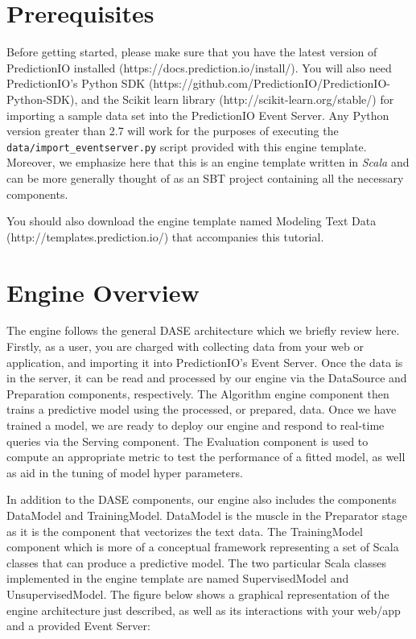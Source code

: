 \documentclass[a4paper,12pt]{article}
\renewcommand{\it}[1]{\textit{#1}}
\renewcommand{\tt}[1]{\texttt{#1}}
\newcommand{\3}{\left}
\newcommand{\4}{\right}
\renewcommand{\-}[1]{{}^{-#1}}
\begin{document}
\section*{Prerequisites}

Before getting started, please make sure that you have the latest version of PredictionIO installed (https://docs.prediction.io/install/). You will also need PredictionIO's Python SDK (https://github.com/PredictionIO/PredictionIO-Python-SDK), and the Scikit learn library (http://scikit-learn.org/stable/) for importing a sample data set into the PredictionIO Event Server. Any Python version greater than 2.7 will work for the purposes of executing the \tt{data/import\_eventserver.py} script provided with this engine template. Moreover, we emphasize here that this is an engine template written in \it{Scala} and can be more generally thought of as an SBT project containing all the necessary components.

You should also download the engine template named Modeling Text Data (http://templates.prediction.io/) that accompanies this tutorial.

\section*{Engine Overview}

The engine follows the general DASE architecture which we briefly review here. Firstly, as a user, you are charged with collecting data from your web or application, and importing it into PredictionIO's Event Server. Once the data is in the server, it  can be read and processed by our engine via the DataSource and Preparation components, respectively. The Algorithm engine component then trains a predictive model using the processed, or prepared, data. Once we have trained a model, we are ready to deploy our engine and respond to real-time queries via the Serving component. The Evaluation component is used to compute an appropriate metric to test the performance of a fitted model, as well as aid in the tuning of model hyper parameters. 

In addition to the DASE components, our engine also includes the components DataModel and TrainingModel. DataModel is the muscle in the Preparator stage as it is the component that vectorizes the text data. The TrainingModel component which is more of a conceptual framework representing a set of Scala classes that can produce a predictive model. The two particular Scala classes implemented in the engine template are named SupervisedModel and UnsupervisedModel. The figure below shows a graphical representation of the engine architecture just described, as well as its interactions with your web/app and a provided Event Server:
\end{document}
